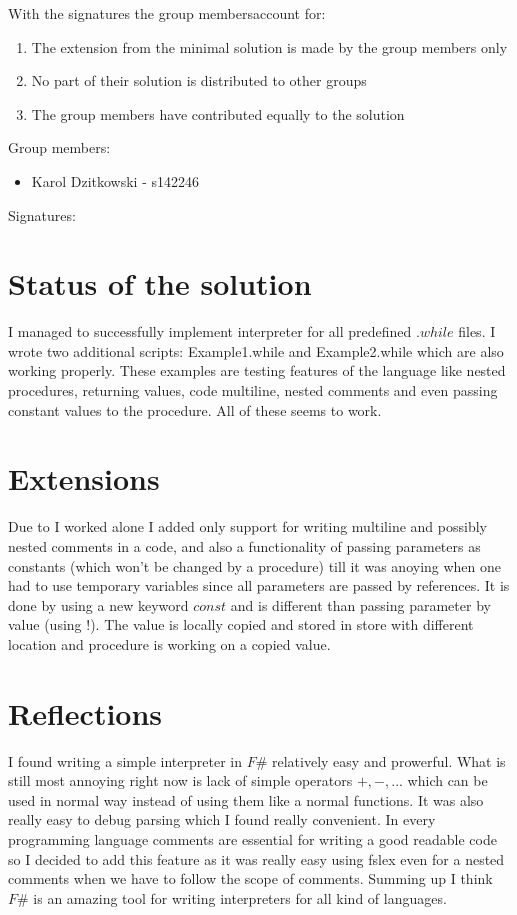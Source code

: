 \documentclass[12pt]{article}
\begin{document}
\maketitle
\setlength{\parindent}{0pt}
With the signatures the group membersaccount for:
\begin{enumerate}
\item The extension from the minimal solution is made by the group
members only
\item No part of their solution is distributed to other groups
\item The group members have contributed equally to the solution
\end{enumerate}
Group members:
\begin{itemize}
\item Karol Dzitkowski - s142246
\end{itemize}
Signatures:
\clearpage

\section{Status of the solution}
I managed to successfully implement interpreter for all predefined $.while$ files. 
I wrote two additional scripts: Example1.while and Example2.while which are also working properly.
These examples are testing features of the language like nested procedures, returning values, 
code multiline, nested comments and even passing constant values to the procedure. 
All of these seems to work.

\section{Extensions}
Due to I worked alone I added only support for writing multiline and possibly nested comments in a code,
and also a functionality of passing parameters as constants (which won't be changed by a procedure) till
it was anoying when one had to use temporary variables since all parameters are passed by references. It
is done by using a new keyword $const$ and is different than passing parameter by value (using $!$). The
value is locally copied and stored in store with different location and procedure is working on a copied value.

\section{Reflections}
I found writing a simple interpreter in $F\#$ relatively easy and prowerful. What is still most annoying
right now is lack of simple operators $+,-,...$ which can be used in normal way instead of using them like
a normal functions. It was also really easy to debug parsing which I found really convenient. In every
programming language comments are essential for writing a good readable code so I decided to add this
feature as it was really easy using fslex even for a nested comments when we have to follow the scope of
comments. Summing up I think $F\#$ is an amazing tool for writing interpreters for all kind of languages.
\end{document}
